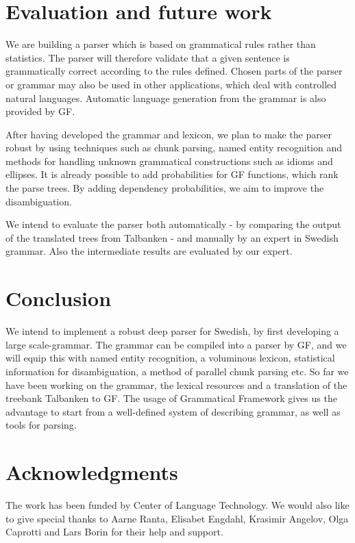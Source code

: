 \documentclass[submission]{eptcs} %
\begin{document}
\section{Evaluation and future work}
We are building a parser which is based on grammatical rules rather than
statistics. The parser will therefore validate that
a given sentence is grammatically correct according to the rules defined.
Chosen parts of the parser or grammar may also be used in other applications,
which deal with controlled natural languages. Automatic language
generation from the grammar is also provided by GF.

After having developed the grammar and lexicon, we plan to 
make the parser robust by using techniques such as chunk parsing, named
entity recognition and methods for handling unknown 
grammatical constructions such as idioms and ellipses. %
It is already possible to add probabilities for GF functions,
which rank the parse trees.
By adding dependency probabilities, we aim to improve the
disambiguation.

We intend to evaluate the parser both automatically - by comparing the output of
the translated trees from Talbanken - and manually by an expert in Swedish grammar.
Also the intermediate results are evaluated by our expert.


\section{Conclusion}
We intend to implement a robust deep parser for Swedish, by first developing
a large scale-grammar. The grammar can be compiled into a
parser by GF, and we will equip this with named entity recognition, a
voluminous lexicon, statistical information for disambiguation,
a method of parallel chunk parsing etc.
So far we have been working on the grammar, the lexical resources and
a translation of the treebank Talbanken to GF.
The usage of Grammatical Framework gives us the advantage to start from
a well-defined system of describing grammar, as well as tools for
parsing.


\section{Acknowledgments}
The work has been funded by Center of Language Technology.
We would also like to give special thanks to Aarne Ranta, %
Elisabet Engdahl, Krasimir Angelov, Olga Caprotti and Lars Borin for their help
and support.



\nocite{*}


\end{document}
